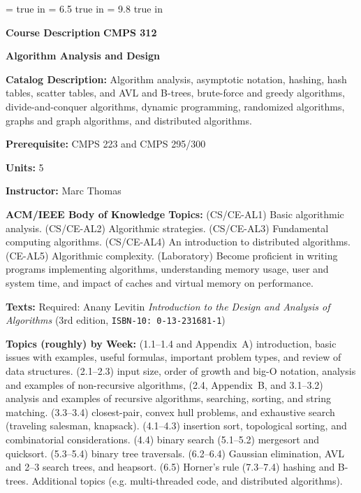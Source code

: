 %
%
\def\scriptA{{\cal A}}   %
\def\boldN{{\bf N}}
\def\boldR{{\bf R}}
\def\boldRP{{\bf R}$^+$}   %
\def\boldC{{\bf C}}
%
%

\magnification=   %
\nopagenumbers
{} true in
\hsize = 6.5 true in       %
\vsize = 9.8 true in
\baselineskip12pt
\parskip2pt

\noindent 
{\bf Course Description} \hfill\break
{\bf CMPS 312} 

\centerline{\bf Algorithm Analysis and Design}
\vskip5pt

\noindent
{\bf Catalog Description:}
	\itemitem{} Algorithm analysis, asymptotic notation, hashing, 
	hash tables, scatter tables, and AVL and B-trees, brute-force 
	and greedy algorithms, divide-and-conquer algorithms, dynamic 
	programming, randomized algorithms, graphs and graph algorithms, 
	and distributed algorithms.

\noindent
{\bf Prerequisite:}
	\itemitem{} CMPS 223 and CMPS 295/300

\noindent
{\bf Units:}
	\itemitem{} 5

\noindent
{\bf Instructor:} 
	\itemitem{} Marc Thomas

\noindent
{\bf ACM/IEEE Body of Knowledge Topics:}
	\itemitem{} (CS/CE-AL1) Basic algorithmic analysis.
	\itemitem{} (CS/CE-AL2) Algorithmic strategies.
	\itemitem{} (CS/CE-AL3) Fundamental computing algorithms.
	\itemitem{} (CS/CE-AL4) An introduction to distributed algorithms.
	\itemitem{} (CE-AL5) Algorithmic complexity.
	\itemitem{} (Laboratory) Become proficient in writing
	  programs implementing algorithms, understanding memory usage,
	  user and system time, and impact of caches and virtual memory
	  on performance.

\noindent
{\bf Texts:}
	\itemitem{} Required: 
	Anany Levitin {\it Introduction to the Design and Analysis
	of Algorithms} (3rd edition, {\tt ISBN-10: 0-13-231681-1})

\noindent
{\bf Topics (roughly) by Week:}
	\itemitem{}  (1.1--1.4 and Appendix~A) introduction, basic
	  issues with examples, useful formulas, important problem types, 
	  and review of data structures.
	\itemitem{}  (2.1--2.3) input size, order of growth and big-{\cal O}
	  notation, analysis and examples of non-recursive algorithms,
	\itemitem{}  (2.4, Appendix~B, and 3.1--3.2) analysis and
	  examples of recursive algorithms,
	  searching, sorting, and string matching.
	\itemitem{}  (3.3--3.4) closest-pair, convex hull problems,
	  and exhaustive search (traveling salesman, knapsack).
	\itemitem{}  (4.1--4.3) insertion sort, topological sorting,
	  and combinatorial considerations.
	\itemitem{}  (4.4) binary search (5.1--5.2) mergesort and quicksort.
	\itemitem{}  (5.3--5.4) binary tree traversals.
	\itemitem{}  (6.2--6.4) Gaussian elimination, AVL and 2--3 
	  search trees, and heapsort.
	\itemitem{}  (6.5) Horner's rule (7.3--7.4) hashing and B-trees.
	\itemitem{}  Additional topics (e.g. multi-threaded code, and
	  distributed algorithms).

